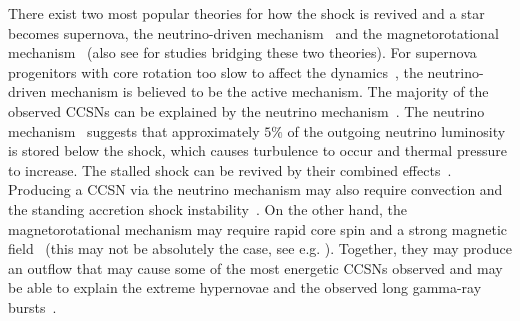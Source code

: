\documentclass[aps,twocolumn,showpacs,groupedaddress, nofootinbib]{revtex4}  %
\begin{document}
%
%
There exist two most popular theories for how the shock is revived and a star becomes supernova, 
the neutrino-driven mechanism~\cite{bethe1985revival, bethe1990supernova} and the
magnetorotational mechanism~\cite{janka2012explosion, kotake2012core,
mezzacappa2014two} (also see \cite{obergaulinger2006axisymmetric, obergaulinger2006axisymmetric2} for studies bridging these two theories). 
For supernova progenitors with core rotation too slow to
affect the dynamics~\cite{takiwaki2016three, summa2018rotation}, the
neutrino-driven mechanism is believed to be the active mechanism. The majority
of the observed \acp{CCSN} can be explained by the neutrino
mechanism~\cite{bruenn2016development}. The neutrino
mechanism~\cite{bethe1985revival, janka2007theory} suggests that approximately
$5\%$ of the outgoing neutrino luminosity is stored below the shock, which
causes turbulence to occur and thermal pressure to increase. The stalled shock
can be revived by their combined effects~\cite{couch2015role}. Producing a
\ac{CCSN} via the neutrino mechanism may also require convection and the
standing accretion shock instability~\cite{blondin2003stability}. On the other
hand, the magnetorotational mechanism may require rapid core spin and a strong
magnetic field~\cite{leblanc1970numerical, burrows2007simulations,
takiwaki2009special,
moiseenko2006magnetorotational,mosta2014magnetorotational} 
(this may not be absolutely the case, see e.g. \cite{obergaulinger2019magnetorotational}). Together, they may
produce an outflow that may cause some of the most energetic \acp{CCSN}
observed and may be able
to explain the extreme hypernovae and the observed long gamma-ray
bursts~\cite{woosley2006progenitor, yoon2005evolution, de2013rotation, obergaulinger2017protomagnetar}.
 
\end{document}
